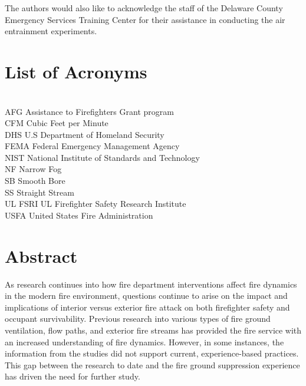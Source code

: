 \documentclass[12pt,oneside]{book}
\begin{document}
The authors would also like to acknowledge the staff of the Delaware County Emergency Services Training Center for their assistance in conducting the air entrainment experiments.

\cleardoublepage
{}
{}
\tableofcontents

\cleardoublepage
{}
{}
\listoffigures

\cleardoublepage
{}
{}
\listoftables

\chapter{List of Acronyms}

\begin{tabbing}
\hspace{1.5in} \= \\
AFG \> Assistance to Firefighters Grant program  \\
CFM \> Cubic Feet per Minute \\
DHS \> U.S Department of Homeland Security   \\   
FEMA \> Federal Emergency Management Agency  \\
NIST \> National Institute of Standards and Technology \\
NF \> Narrow Fog \\
SB \> Smooth Bore \\
SS \> Straight Stream \\
UL FSRI \> UL Firefighter Safety Research Institute \\
USFA \> United States Fire Administration  \\
\end{tabbing}

\newpage

\mainmatter

\chapter*{\centering Abstract}
As research continues into how fire department interventions affect fire dynamics in the modern fire environment, questions continue to arise on the impact and implications of interior versus exterior fire attack on both firefighter safety and occupant survivability. Previous research into various types of fire ground ventilation, flow paths, and exterior fire streams has provided the fire service with an increased understanding of fire dynamics. However, in some instances, the information from the studies did not support current, experience-based practices. This gap between the research to date and the fire ground suppression experience has driven the need for further study. 
\end{document}
